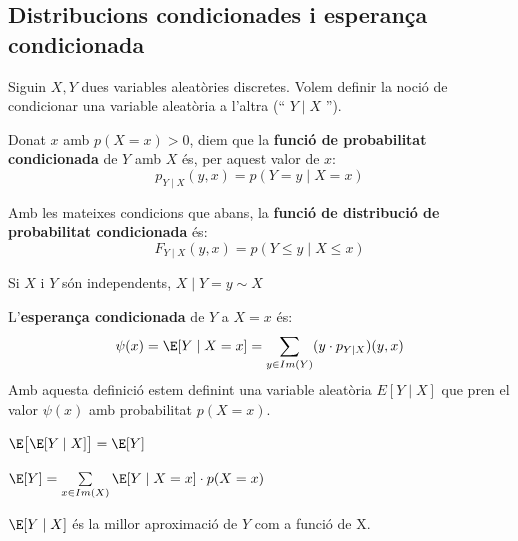 \newpage

\subsection{Distribucions condicionades i esperança condicionada}
Siguin $X,Y$ dues variables aleatòries discretes. Volem definir la noció de condicionar una variable aleatòria a l'altra (`` $Y\mid X$ '').

\begin{defi}
  Donat $x$ amb $p(X=x)>0$, diem que la \textbf{funció de probabilitat condicionada} de $Y$ amb $X$ és, per aquest valor de $x$:
  \[
    p_{Y\mid X}(y,x) = p(Y=y\mid X=x)
  \]
\end{defi}

\begin{defi}
  Amb les mateixes condicions que abans, la \textbf{funció de distribució de probabilitat condicionada} és:
  \[
    F_{Y\mid X}(y,x) = p(Y\leq y \mid X \leq x)
  \]
\end{defi}

\begin{obs}
  Si $X$ i $Y$ són independents, $X\mid Y=y \sim X$
\end{obs}

\begin{defi}
  L'\textbf{esperança condicionada} de $Y$ a $X=x$ és: 
  \[
    \psi(x) = \E[Y\mid X=x] = \sum_{y\in Im(Y)}(y\cdot p_{Y\mid X})(y,x)
  \]
  Amb aquesta definició estem definint una variable aleatòria $E[Y\mid X]$ que pren el valor $\psi(x)$ amb probabilitat $p(X=x)$.
\end{defi}

\begin{prop}
  $\E\big[\E[Y\mid X]\big] = \E[Y]$
\end{prop}

\begin{obs}
  $\E[Y] = \sum\limits_{x\in Im(X)}\E[Y\mid X=x]\cdot p(X=x)$
\end{obs}

\begin{obs}
  $\E[Y\mid X]$ és la millor aproximació de $Y$ com a funció de X.
\end{obs}

